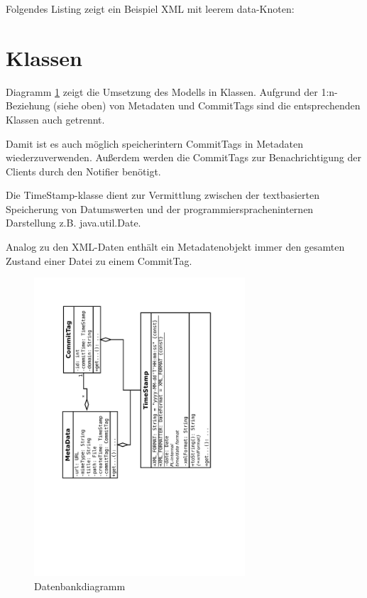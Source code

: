 Folgendes Listing zeigt ein Beispiel XML mit leerem data-Knoten:


\section{Klassen} \label{design:data:classes}
Diagramm \ref{dia:design:frontend:data:classes} zeigt die Umsetzung des Modells in Klassen.
Aufgrund der 1:n-Beziehung (siehe oben) von Metadaten und CommitTags sind die entsprechenden
Klassen auch getrennt. 

Damit ist es auch möglich speicherintern CommitTags in Metadaten wiederzuverwenden.
Außerdem werden die CommitTags zur Benachrichtigung der Clients durch den Notifier benötigt.


Die TimeStamp-klasse dient zur Vermittlung zwischen der textbasierten Speicherung von Datumswerten und der
programmierspracheninternen Darstellung z.B. java.util.Date.

Analog zu den XML-Daten enthält ein Metadatenobjekt immer den gesamten Zustand einer Datei zu einem CommitTag.

\begin{figure}[h]
	\centering
	\label{dia:design:frontend:data:classes}
	\includegraphics[width=0.7\textwidth, angle=270]{design/data/model.pdf}
	\caption{Datenbankdiagramm}
\end{figure}

